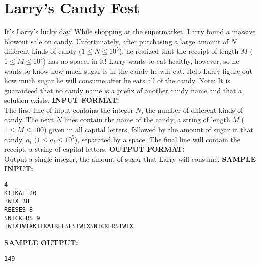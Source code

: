 \documentclass{article}
\begin{document}
\newcommand{\blank}{\vskip 3mm}
\setlength\parindent{0pt}
\renewcommand\thesection{\Alph{section}}

\setcounter{section}{5}
\section{Larry's Candy Fest}

It's Larry's lucky day! While shopping at the supermarket, Larry found a massive blowout sale on candy. Unfortunately, after purchasing a large amount of $ N $ different kinds of candy ($ 1 \leq N \leq 10^5 $), he realized that the receipt of length $ M $ ($ 1 \leq M \leq 10^4 $) has no spaces in it! Larry wants to eat healthy, however, so he wants to know how much sugar is in the candy he will eat.  Help Larry figure out how much sugar he will consume after he eats all of the candy.
\blank
Note: It is guaranteed that no candy name is a prefix of another candy name and that a solution exists.
\blank
\textbf{INPUT FORMAT:}\\
The first line of input contains the integer $ N $, the number of different kinds of candy.  The next $ N $ lines contain the name of the candy, a string of length $ M $ ($ 1 \leq M \leq 100 $) given in all capital letters, followed by the amount of sugar in that candy, $a_i$ ($1 \leq a_i \leq 10^5$), separated by a space.  The final line will contain the receipt, a string of capital letters.
\blank
\textbf{OUTPUT FORMAT:}\\
Output a single integer, the amount of sugar that Larry will consume.
\blank
\textbf{SAMPLE INPUT:}
\begin{verbatim}
4
KITKAT 20
TWIX 28
REESES 8
SNICKERS 9
TWIXTWIXKITKATREESESTWIXSNICKERSTWIX
\end{verbatim}
\textbf{SAMPLE OUTPUT:}
\begin{verbatim}
149
\end{verbatim}
\end{document}
